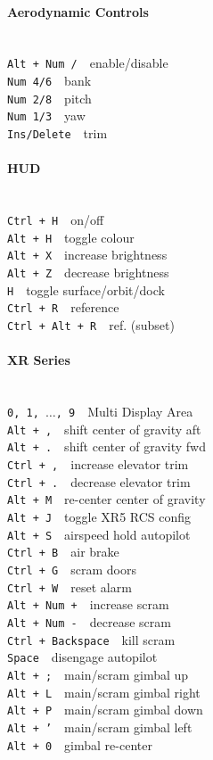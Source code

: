 \documentclass[11pt]{scrartcl} %
\newcommand{\command}[2]{\texttt{#1}~\dotfill{}~#2\\} %
\newcommand{\sectiontitle}[1]{\paragraph{#1} \ \\} %
\newcommand{\sep}{\hspace{5mm}}
\begin{document}
\sep
\begin{minipage}[t]{64mm}
\sectiontitle{Aerodynamic Controls}
\command{Alt + Num /}{enable/disable}
\command{Num 4/6}{bank}
\command{Num 2/8}{pitch}
\command{Num 1/3}{yaw}
\command{Ins/Delete}{trim}

\sectiontitle{HUD}
\command{Ctrl + H}{on/off}
\command{Alt + H}{toggle colour}
\command{Alt + X}{increase brightness}
\command{Alt + Z}{decrease brightness}
\command{H}{toggle surface/orbit/dock}
\command{Ctrl + R}{reference}
\command{Ctrl + Alt + R}{ref. (subset)}

\sectiontitle{XR Series}
\command{0, 1, $\ldots$, 9}{Multi Display Area}
\command{Alt + ,}{shift center of gravity aft}
\command{Alt + .}{shift center of gravity fwd}
\command{Ctrl + ,}{increase elevator trim}
\command{Ctrl + .}{decrease elevator trim}
\command{Alt + M}{re-center center of gravity}
\command{Alt + J}{toggle XR5 RCS config}
\command{Alt + S}{airspeed hold autopilot}
\command{Ctrl + B}{air brake}
\command{Ctrl + G}{scram doors}
\command{Ctrl + W}{reset alarm}
\command{Alt + Num +}{increase scram}
\command{Alt + Num -}{decrease scram}
\command{Ctrl + Backspace}{kill scram}
\command{Space}{disengage autopilot}
\command{Alt + ;}{main/scram gimbal up}
\command{Alt + L}{main/scram gimbal right}
\command{Alt + P}{main/scram gimbal down}
\command{Alt + '}{main/scram gimbal left}
\command{Alt + 0}{gimbal re-center}
\end{minipage}
\sep
\end{document}
